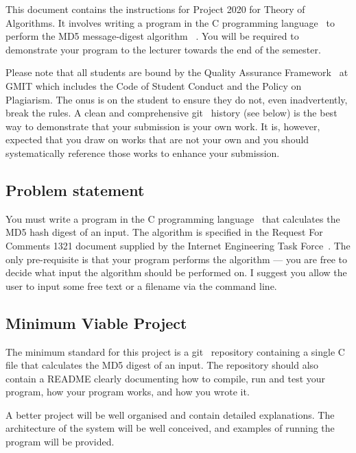 \documentclass[12pt, a4paper]{article}
\title{\projectname}
\author{\modulename}
\date{Due: \duedate}
\newcommand{\modulename}{Theory of Algorithms}
\newcommand{\projectyear}{2020}
\newcommand{\projectname}{Project \projectyear}
\begin{document}
\maketitle

\noindent
This document contains the instructions for \projectname{} for \modulename{}.
It involves writing a program in the C programming language~\cite{cstandard} to perform the MD5 message-digest algorithm ~\cite{md5}.
You will be required to demonstrate your program to the lecturer towards the end of the semester.

Please note that all students are bound by the Quality Assurance Framework~\cite{gmitqaf} at GMIT which includes the Code of Student Conduct and the Policy on Plagiarism.
The onus is on the student to ensure they do not, even inadvertently, break the rules.
A clean and comprehensive git~\cite{git} history (see below) is the best way to demonstrate that your submission is your own work.
It is, however, expected that you draw on works that are not your own and you should systematically reference those works to enhance your submission.

\subsection*{Problem statement}
You must write a program in the C programming language~\cite{cstandard} that calculates the MD5 hash digest of an input.
The algorithm is specified in the Request For Comments 1321 document supplied by the Internet Engineering Task Force~\cite{md5}.
The only pre-requisite is that your program performs the algorithm --- you are free to decide what input the algorithm should be performed on.
I suggest you allow the user to input some free text or a filename via the command line.


\subsection*{Minimum Viable Project}
The minimum standard for this project is a git~\cite{git} repository containing a single C file that calculates the MD5 digest of an input.
The repository should also contain a README clearly documenting how to compile, run and test your program, how your program works, and how you wrote it.

A better project will be well organised and contain detailed explanations.
The architecture of the system will be well conceived, and examples of running the program will be provided.
\end{document}
